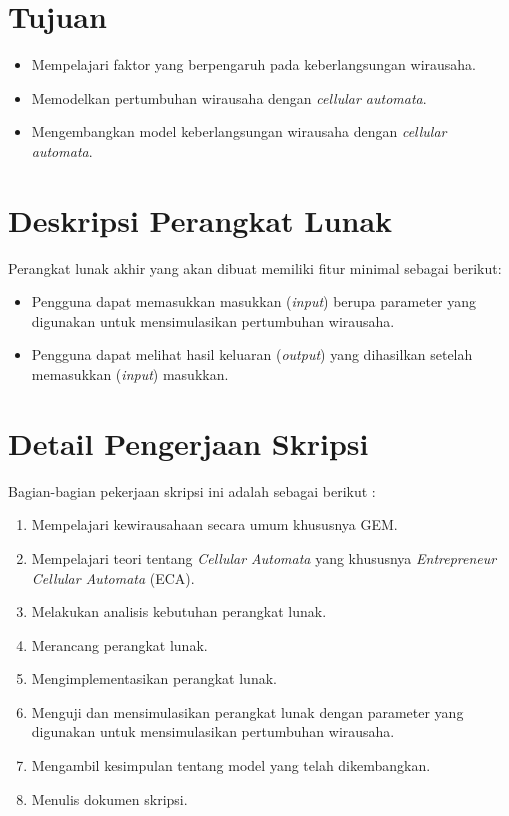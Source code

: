 \documentclass[a4paper,twoside]{article}
\begin{document}
\section{Tujuan}
\begin{itemize}
	\item Mempelajari faktor yang berpengaruh pada keberlangsungan wirausaha.
	\item Memodelkan pertumbuhan wirausaha dengan \textit{cellular automata}.
	\item Mengembangkan model keberlangsungan wirausaha dengan \textit{cellular automata}.
\end{itemize}

\section{Deskripsi Perangkat Lunak}
Perangkat lunak akhir yang akan dibuat memiliki fitur minimal sebagai berikut:
\begin{itemize}
	\item Pengguna dapat memasukkan masukkan (\textit{input}) berupa parameter yang digunakan untuk mensimulasikan pertumbuhan wirausaha.
	\item Pengguna dapat melihat hasil keluaran (\textit{output}) yang dihasilkan setelah memasukkan (\textit{input}) masukkan.
\end{itemize}

\section{Detail Pengerjaan Skripsi}
Bagian-bagian pekerjaan skripsi ini adalah sebagai berikut :
	\begin{enumerate}
		\item Mempelajari kewirausahaan secara umum khususnya GEM.
		\item Mempelajari teori tentang \textit{Cellular Automata} yang khususnya \textit{Entrepreneur Cellular Automata} (ECA).
		\item Melakukan analisis kebutuhan perangkat lunak.
		\item Merancang perangkat lunak.
		\item Mengimplementasikan perangkat lunak.
		\item Menguji dan mensimulasikan perangkat lunak dengan parameter yang digunakan untuk mensimulasikan pertumbuhan wirausaha.
		\item Mengambil kesimpulan tentang model yang telah dikembangkan.
		\item Menulis dokumen skripsi.
	\end{enumerate}
\end{document}
